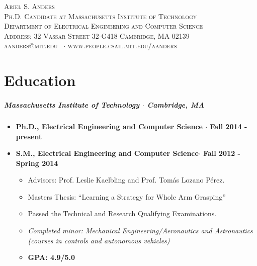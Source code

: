 \documentclass[10pt,letterpaper]{article}
\newcommand{\namestyle}{\Large \scshape}
\newcommand{\deptstyle}{\footnotesize \rmfamily \scshape}
\newcommand{\addressstyle}{\footnotesize \rmfamily \upshape}
\begin{document}
\begin{center}
\namestyle Ariel S. Anders \\[0.3em]
\deptstyle Ph.D. Candidate  at  Massachusetts Institute of Technology \\Department of Electrical Engineering and Computer Science\\[0.2em]
\addressstyle Address: 32 Vassar Street 32-G418 Cambridge, MA 02139\\
    aanders@mit.edu \ $\cdot$ www.people.csail.mit.edu/aanders
\end{center}

\section*{Education}
 \subparagraph{Massachusetts Institute of Technology $\cdot$ Cambridge, MA}

\begin{itemize}
    \item {\bf Ph.D., Electrical Engineering and Computer Science $\cdot$ Fall 2014 - present}
    \item {\bf S.M., Electrical Engineering and Computer Science$\cdot$ Fall 2012 - Spring 2014}

 	\begin{itemize}
        \item Advisors: Prof. Leslie Kaelbling and Prof. Tom\'as Lozano P\'erez.
	    \item Masters Thesis: ``Learning a Strategy for Whole Arm Grasping''
        \item Passed the Technical and Research Qualifying Examinations.
        \item {\em Completed minor: Mechanical Engineering/Aeronautics and Astronautics\\
                (courses in controls and autonomous vehicles)}
        \item {\bf GPA:  4.9/5.0 }
	\end{itemize}
\end{itemize}
\end{document}
